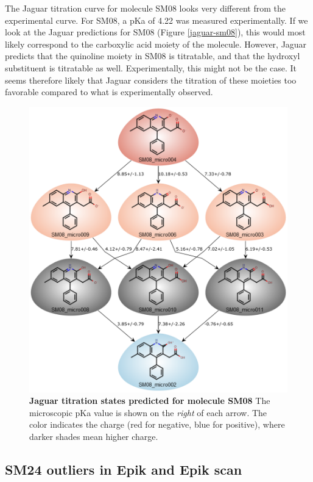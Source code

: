 \documentclass[9pt,lineno,final]{elife}
\begin{document}
The Jaguar titration curve for molecule SM08 looks very different from the experimental curve.
%
For SM08, a pKa of 4.22 was measured experimentally.
%
If we look at the Jaguar predictions for SM08 (Figure \ref{jaguar-sm08}), this would most likely correspond to the carboxylic acid moiety of the molecule.
%
However, Jaguar predicts that the quinoline moiety in SM08 is
 titratable, and that the hydroxyl substituent is titratable as well. 
%
Experimentally, this might not be the case.
%
It seems therefore likely that Jaguar considers the titration of these
moieties too favorable compared to what is experimentally observed.

\begin{figure}[H]
    \centering
    \includegraphics[scale=0.5]{Images/Graphs/SM08-Jaguar-micropka.graph.pdf}
    \caption{{\bf Jaguar titration states predicted for molecule SM08} The microscopic pKa value is shown on the \textit{right} of each arrow. The color indicates the charge (red for negative, blue for positive), where darker shades mean higher charge.}
    \label{fig:jaguar-sm08}
\end{figure}


\subsection{SM24 outliers in Epik and Epik scan}
\end{document}
